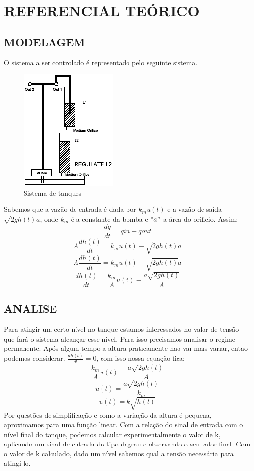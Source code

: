 \documentclass[a4paper,12pt]{article}
\begin{document}
\newpage


\thispagestyle{main}

\section{REFERENCIAL TEÓRICO}

\subsection{MODELAGEM}
\hspace{4ex}O sistema a ser controlado é representado pelo seguinte sistema.
\begin{figure}[h]
\includegraphics[scale=1]{tanques.png}
\caption{Sistema de tanques}
\label{fig:tanques}
\end{figure}

\hspace{4ex}Sabemos que a vazão de entrada é dada por $ k_mu(t) $ e a vazão de saída $ \sqrt{2gh(t)}a $, onde $k_m$ é a constante da bomba e $"a"$ a área do orificio. Assim: 
\[ \frac{dq}{dt}=qin-qout\]
\[ A\frac{dh(t)}{dt}=k_mu(t)-\sqrt{2gh(t)}a \]
\[ A\frac{dh(t)}{dt}=k_mu(t)-\sqrt{2gh(t)}a \]
\[ \frac{dh(t)}{dt}= \frac{k_m}{A}u(t)- \frac{a\sqrt{2gh(t)}}{A} \]

\subsection{ANALISE}
\hspace{4ex}Para atingir um certo nível no tanque estamos interessados no valor de tensão que fará o sistema alcançar esse nível. Para isso precisamos analisar o regime permanente. Após algum tempo a altura praticamente não vai mais variar, então podemos considerar.  $\frac{dh(t)}{dt}=0 $, com isso nossa equação fica:
\[ \frac{k_m}{A}u(t)= \frac{a\sqrt{2gh(t)}}{A} \]
\[ u(t)=  \frac{a\sqrt{2gh(t)}}{k_m}\]
\begin{equation}\label{eq:1}
u(t)=k\sqrt{h(t)}
\end{equation}
\hspace{4ex}Por questões de simplificação e como a variação da altura é pequena, aproximamos para uma função linear. Com a relação do sinal de entrada com o nível final do tanque, podemos calcular experimentalmente o valor de k, aplicando um sinal de entrada do tipo degrau e observando o seu valor final.
Com o valor de k calculado, dado um nível sabemos qual a tensão necessária para atingi-lo.
\end{document}
